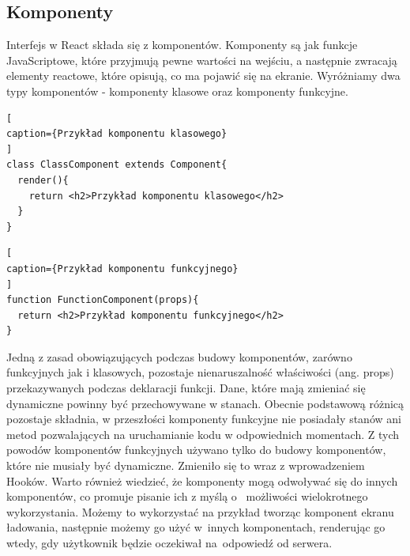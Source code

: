 \documentclass[oneside,polski,logo,indent]{amuthesis}
\begin{document}
\subsection{Komponenty}
{
Interfejs w React składa się z komponentów. Komponenty są jak funkcje JavaScriptowe, które przyjmują pewne wartości na wejściu, a następnie zwracają elementy reactowe, które opisują, co ma pojawić się na ekranie.
Wyróżniamy dwa typy komponentów - komponenty klasowe oraz komponenty funkcyjne.
\begin{lstlisting}[
caption={Przykład komponentu klasowego}
]
class ClassComponent extends Component{
  render(){
    return <h2>Przykład komponentu klasowego</h2>
  }
}
\end{lstlisting}
\begin{lstlisting}[
caption={Przykład komponentu funkcyjnego}
]
function FunctionComponent(props){
  return <h2>Przykład komponentu funkcyjnego</h2>
}
\end{lstlisting}
Jedną z zasad obowiązujących podczas budowy komponentów, zarówno funkcyjnych jak i klasowych, pozostaje nienaruszalność właściwości    (ang. props) przekazywanych podczas deklaracji funkcji. Dane, które mają zmieniać się dynamiczne powinny być przechowywane w stanach.
Obecnie podstawową różnicą pozostaje składnia, w przeszłości komponenty funkcyjne nie posiadały stanów ani metod pozwalających na uruchamianie kodu w odpowiednich momentach. Z tych powodów komponentów funkcyjnych używano tylko do budowy komponentów, które nie musiały być dynamiczne. Zmieniło się to wraz z wprowadzeniem Hooków.
Warto również wiedzieć, że komponenty mogą odwoływać się do innych komponentów, co promuje pisanie ich z myślą o~ możliwości wielokrotnego wykorzystania. Możemy to wykorzystać na przykład tworząc komponent ekranu ładowania, następnie możemy go użyć w~innych komponentach, renderując go wtedy, gdy użytkownik będzie oczekiwał na~odpowiedź od serwera.
}
\end{document}
